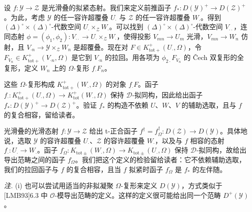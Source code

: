  设 $f:\mathcal{Y}\to\mathcal{Z}$ 是光滑叠的拟紧态射。我们来定义前推函子 $f_{*}:D(\mathcal{Y})^{+}\to D(\mathcal{Z})^{+}$。为此，考虑 $\mathcal{Y}$ 的任一容许超覆叠 $U_{\cdot}$ 与 $\mathcal{Z}$ 的任一容许超覆叠 $W_{\cdot}$。得到 $(\Delta)^{\circ}\times(\Delta)^{\circ}$-代数空间 $U_{\cdot}\times_{\mathcal{Z}}W_{\cdot}$。可以找到 $(\Delta)^{\circ}\times(\Delta)^{\circ}$-代数空间 $V_{\cdot\cdot}$，连同态射 $\phi=(\phi_{1},\phi_{2}):V_{\cdot\cdot}\to U_{\cdot}\times_{\mathcal{Z}}W_{\cdot}$，使得投影 $V_{mn}\to U_{m}$ 光滑，$V_{mn}\to W_{n}$ 仿射，且 $V_{\cdot n}\to\mathcal{Y}\times_{\mathcal{Z}}W_{n}$ 是超覆叠。现在对 $F\in K^{+}_{\mathrm{tot}+}(U_{\cdot},\Omega)$，令 $F_{V_{n}}\in K^{+}_{\mathrm{tot}+}(V_{\cdot n},\Omega)$ 是它到 $V_{\cdot n}$ 的拉回。用各项为 $\phi_{2\cdot}F_{V_{n}}$ 的 Čech 双复形的全复形，定义 $W_{n}$ 上的 $\Omega$-复形 $f_{\cdot}F_{n}$。


这些 $\Omega$-复形构成 $K^{+}_{\mathrm{tot}+}(W_{\cdot},\Omega)$ 的对象 $f_{\cdot}F$。函子 $f_{\cdot}:K^{+}_{\mathrm{tot}+}(U_{\cdot},\Omega)\to K^{+}_{\mathrm{tot}}(W_{\cdot},\Omega)$ 保持 $\mathcal{D}$-拟同构，因此给出函子 $f_{*}:D(\mathcal{Y})^{+}\to D(\mathcal{Z})^{+}$。验证 $f_{*}$ 的构造不依赖 $U$、$W$、$V$ 的辅助选取，且与 $f$ 的复合相容，留给读者。


光滑叠的光滑态射 $f:\mathcal{Y}\to\mathcal{Z}$ 给出 t-正合函子 $f^{\dagger}=f^{\dagger}_{\Omega}:D(\mathcal{Z})\to D(\mathcal{Y})$。具体地说，选取 $\mathcal{Y}$ 的容许超覆叠 $U_{\cdot}$、$\mathcal{Z}$ 的容许超覆叠 $W_{\cdot}$，以及与 $f$ 相容的态射 $f_{\cdot}:U_{\cdot}\to W_{\cdot}$。函子 $f^{\cdot}_{\Omega}:K_{\mathrm{tot}\pm}(W_{\cdot},\Omega)\to K_{\mathrm{tot}\pm}(U_{\cdot},\Omega)$ 保持 $\mathcal{D}$-拟同构，故给出导出范畴之间的函子 $f^{\cdot}_{\Omega}$。我们把这个定义的检验留给读者：它不依赖辅助选取，我们的拉回函子与 $f$ 的复合相容，且当 $f$ 拟紧时函子 $f^{\cdot}_{\Omega}$ 是 $f_{*}$ 的左伴随。



 \emph{注.} (i) 也可以尝试用适当的非拟凝聚 $\Omega$-复形来定义 $D(\mathcal{Y})$，方式类似于 [LMB93]6.3 中 $\mathcal{O}$-模导出范畴的定义。这样的定义很可能给出同一个范畴 $D^{+}(\mathcal{Y})$。

